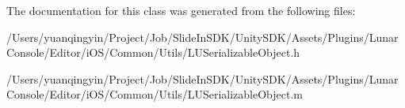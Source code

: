 The documentation for this class was generated from the following files\+:\begin{DoxyCompactItemize}
\item 
/\+Users/yuanqingyin/\+Project/\+Job/\+Slide\+In\+S\+D\+K/\+Unity\+S\+D\+K/\+Assets/\+Plugins/\+Lunar\+Console/\+Editor/i\+O\+S/\+Common/\+Utils/L\+U\+Serializable\+Object.\+h\item 
/\+Users/yuanqingyin/\+Project/\+Job/\+Slide\+In\+S\+D\+K/\+Unity\+S\+D\+K/\+Assets/\+Plugins/\+Lunar\+Console/\+Editor/i\+O\+S/\+Common/\+Utils/L\+U\+Serializable\+Object.\+m\end{DoxyCompactItemize}
